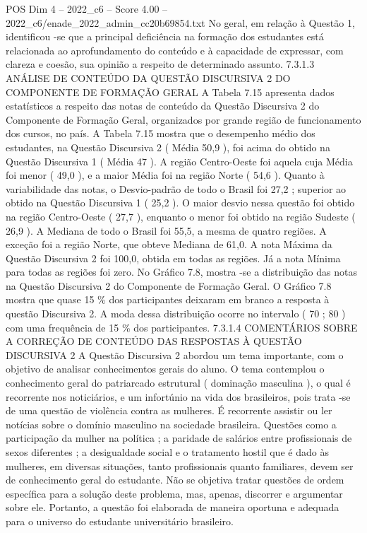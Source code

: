 \begin{textsample}{POS Dim 4 – 2022\_c6 – Score 4.00 – 2022\_c6/enade\_2022\_admin\_cc20b69854.txt}
No geral, em relação à Questão 1, identificou -se que a principal deficiência na formação dos estudantes está relacionada ao aprofundamento do conteúdo e à capacidade de expressar, com clareza e coesão, sua opinião a respeito de determinado assunto. 7.3.1.3 ANÁLISE DE CONTEÚDO DA QUESTÃO DISCURSIVA 2 DO COMPONENTE DE FORMAÇÃO GERAL A Tabela 7.15 apresenta dados estatísticos a respeito das notas de conteúdo da Questão Discursiva 2 do Componente de Formação Geral, organizados por grande região de funcionamento dos cursos, no país.
A Tabela 7.15 mostra que o desempenho médio dos estudantes, na Questão Discursiva 2 ( Média 50,9 ), foi acima do obtido na Questão Discursiva 1 ( Média 47 ).
A região Centro-Oeste foi aquela cuja Média foi menor ( 49,0 ), e a maior Média foi na região Norte ( 54,6 ).
Quanto à variabilidade das notas, o Desvio-padrão de todo o Brasil foi 27,2 ; superior ao obtido na Questão Discursiva 1 ( 25,2 ).
O maior desvio nessa questão foi obtido na região Centro-Oeste ( 27,7 ), enquanto o menor foi obtido na região Sudeste ( 26,9 ).
A Mediana de todo o Brasil foi 55,5, a mesma de quatro regiões.
A exceção foi a região Norte, que obteve Mediana de 61,0.
A nota Máxima da Questão Discursiva 2 foi 100,0, obtida em todas as regiões.
Já a nota Mínima para todas as regiões foi zero.
No Gráfico 7.8, mostra -se a distribuição das notas na Questão Discursiva 2 do Componente de Formação Geral.
O Gráfico 7.8 mostra que quase 15 \% dos participantes deixaram em branco a resposta à questão Discursiva 2.
A moda dessa distribuição ocorre no intervalo ( 70 ; 80 ) com uma frequência de 15 \% dos participantes. 7.3.1.4 COMENTÁRIOS SOBRE A CORREÇÃO DE CONTEÚDO DAS RESPOSTAS À QUESTÃO DISCURSIVA 2 A Questão Discursiva 2 abordou um tema importante, com o objetivo de analisar conhecimentos gerais do aluno.
O tema contemplou o conhecimento geral do patriarcado estrutural ( dominação masculina ), o qual é recorrente nos noticiários, e um infortúnio na vida dos brasileiros, pois trata -se de uma questão de violência contra as mulheres.
É recorrente assistir ou ler notícias sobre o domínio masculino na sociedade brasileira.
Questões como a participação da mulher na política ; a paridade de salários entre profissionais de sexos diferentes ; a desigualdade social e o tratamento hostil que é dado às mulheres, em diversas situações, tanto profissionais quanto familiares, devem ser de conhecimento geral do estudante.
Não se objetiva tratar questões de ordem específica para a solução deste problema, mas, apenas, discorrer e argumentar sobre ele.
Portanto, a questão foi elaborada de maneira oportuna e adequada para o universo do estudante universitário brasileiro.

\end{textsample}
